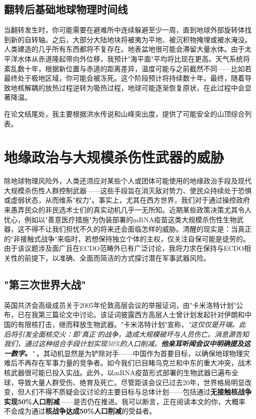 \documentclass[10pt,twocolumn,letterpaper]{article}
\begin{document}
\subsection{翻转后基础地球物理时间线}
当翻转发生时，你可能需要在避难所中连续躲避至少一周，直到地球外部旋转体找到新的自转轴。之后，大部分大陆地块将被夷为平地、被沉积物掩埋或被水淹没。人类建造的几乎所有东西都将不复存在。地表盆地很可能会滞留大量水体。由于太平洋水体从赤道隆起带向外位移，我预计"海平面"平均将比现在更高。天气系统将紊乱数十年，根据新位置与赤道的距离差异，温度可能与之前截然不同——比如若最终处于极地区域，你可能会被冻死。这个阶段预计将持续数十年。最终，随着导致地核解耦的放热过程逆转为吸热过程，地球可能逐渐恢复原状，在此过程中会显著降温。

在论文结尾处，我主要根据洪水传说和山峰突出度，提供了可能安全的山顶综合列表。
\section{地缘政治与大规模杀伤性武器的威胁}

除地球物理风险外，人类还须应对某些个人或团体可能使用的地缘政治手段及现代大规模杀伤性人群控制武器——这些手段旨在消灭敌对势力、使民众持续处于恐惧或虚弱状态，从而维系"权力"。事实上，尤其在西方世界，我们对于通过操控政府来愚弄民众的非民选术士们的真实动机几乎一无所知。近期某些政策决策尤其令人忧心，例如以"善意医疗措施"为伪装部署的mRNA疫苗这类大规模杀伤性生物武器，这不得不让我们担忧不久的将来还会面临怎样的威胁。清醒的现实是：当真正的"非接触式战争"来临时，若想保持独立个体的主权，仅关注自保可能是徒劳的。由于该议题涉及面广且在ECDO范畴外已有广泛讨论，我将力求在保持与ECDO相关性的前提下，以准确、全面而简洁的方式探讨潜在军事武器风险。

\subsection{"第三次世界大战"}
英国共济会高级成员关于2005年伦敦高层会议的举报证词，由"卡米洛特计划"公布，已在我第三篇论文中讨论。该证词披露西方高层人士曾计划发起针对伊朗和中国的有限核打击，继而释放生物武器。"卡米洛特计划"宣称，\textit{"这仅仅是开端。此后将引发全面核交火：即'真正'的战争，造成大规模破坏与人员伤亡。消息源告知我们，通过这种组合手段计划实现50\%的人口削减。\textbf{他亲耳听闻会议中明确提及这一数字。}"} \cite{23}。其动机显然是为铲除对手——中国作为首要目标，以确保地球物理灾难后不再存在军事力量的竞争者。如今我们已目睹乌克兰和中东的重大冲突，战术核武器很可能已投入实战。此外，以mRNA疫苗形式部署的生物武器已遍布全球，导致大量人群受伤、绝育及死亡。尽管距该会议已过去20年，世界格局明显改变，但人们不得不质疑会议讨论的主要目标与总体计划——包括通过\textbf{无接触核战争实现50\%人口削减}——是否仍在推进。我可以断言，正在阅读本文的你，大概率不会成为通过\textbf{核战争达成50\%人口削减}的受益者。
\end{document}
